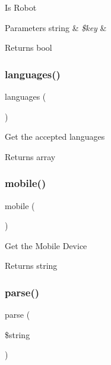 Is Robot


\begin{DoxyParams}[1]{Parameters}
string & {\em \$key} & \\
\hline
\end{DoxyParams}
\begin{DoxyReturn}{Returns}
bool 
\end{DoxyReturn}
\mbox{\label{class_c_i___user__agent_adda8fc15b6fe0efc05a50d2645189c77}} 
\subsubsection{\texorpdfstring{languages()}{languages()}}
{\footnotesize\ttfamily languages (\begin{DoxyParamCaption}{ }\end{DoxyParamCaption})}

Get the accepted languages

\begin{DoxyReturn}{Returns}
array 
\end{DoxyReturn}
\mbox{\label{class_c_i___user__agent_a8e13f70e084cbb413d7b68805f3b09dd}} 
\subsubsection{\texorpdfstring{mobile()}{mobile()}}
{\footnotesize\ttfamily mobile (\begin{DoxyParamCaption}{ }\end{DoxyParamCaption})}

Get the Mobile Device

\begin{DoxyReturn}{Returns}
string 
\end{DoxyReturn}
\mbox{\label{class_c_i___user__agent_a8652be52c4455b8ce1a8e79fdb083703}} 
\subsubsection{\texorpdfstring{parse()}{parse()}}
{\footnotesize\ttfamily parse (\begin{DoxyParamCaption}\item[{}]{\$string }\end{DoxyParamCaption})}

